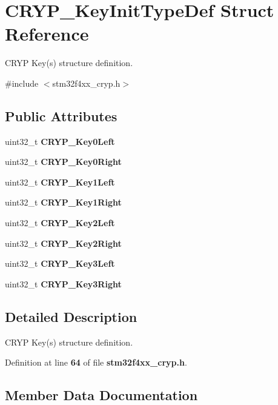 \section{C\+R\+Y\+P\+\_\+\+Key\+Init\+Type\+Def Struct Reference}
\label{structCRYP__KeyInitTypeDef}


C\+R\+YP Key(s) structure definition.  




{\ttfamily \#include $<$stm32f4xx\+\_\+cryp.\+h$>$}

\subsection*{Public Attributes}
\begin{DoxyCompactItemize}
\item 
uint32\+\_\+t \textbf{ C\+R\+Y\+P\+\_\+\+Key0\+Left}
\item 
uint32\+\_\+t \textbf{ C\+R\+Y\+P\+\_\+\+Key0\+Right}
\item 
uint32\+\_\+t \textbf{ C\+R\+Y\+P\+\_\+\+Key1\+Left}
\item 
uint32\+\_\+t \textbf{ C\+R\+Y\+P\+\_\+\+Key1\+Right}
\item 
uint32\+\_\+t \textbf{ C\+R\+Y\+P\+\_\+\+Key2\+Left}
\item 
uint32\+\_\+t \textbf{ C\+R\+Y\+P\+\_\+\+Key2\+Right}
\item 
uint32\+\_\+t \textbf{ C\+R\+Y\+P\+\_\+\+Key3\+Left}
\item 
uint32\+\_\+t \textbf{ C\+R\+Y\+P\+\_\+\+Key3\+Right}
\end{DoxyCompactItemize}


\subsection{Detailed Description}
C\+R\+YP Key(s) structure definition. 

Definition at line \textbf{ 64} of file \textbf{ stm32f4xx\+\_\+cryp.\+h}.



\subsection{Member Data Documentation}
\mbox{\label{structCRYP__KeyInitTypeDef_a54f07204c4708d9704997be2b489a4b4}} 
